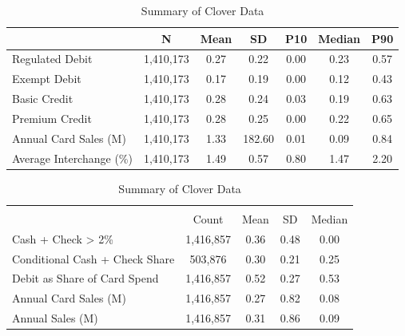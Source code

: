 \documentclass[11pt,english]{article}
\theoremstyle{remark}
\begin{document}
 
\clearpage{}


\begin{table}[H]
  \centering
  \caption{Summary of Fiserv Data}
  \label{tab:fiserv-summary}

  
    \centering
    \caption{Settlement Data Cross Section from 2022}
    \label{tab:settlement-summary}
    
    {
\def\sym#1{\ifmmode^{#1}\else\(^{#1}\)\fi}
\begin{tabular}{l*{1}{cccccc}}
\hline
                    &           N&        Mean&          SD&         P10&      Median&         P90\\
\hline
Regulated Debit     &   1,410,173&        0.27&        0.22&        0.00&        0.23&        0.57\\
Exempt Debit        &   1,410,173&        0.17&        0.19&        0.00&        0.12&        0.43\\
Basic Credit        &   1,410,173&        0.28&        0.24&        0.03&        0.19&        0.63\\
Premium Credit      &   1,410,173&        0.28&        0.25&        0.00&        0.22&        0.65\\
Annual Card Sales (M)&   1,410,173&        1.33&      182.60&        0.01&        0.09&        0.84\\
Average Interchange (\%)&   1,410,173&        1.49&        0.57&        0.80&        1.47&        2.20\\
\hline
\end{tabular}
}
   

  \vspace{0.8em}

  
    \centering
    \caption{Summary of Clover Data}
    \label{tab:clover-summary}
    
    {
\def\sym#1{\ifmmode^{#1}\else\(^{#1}\)\fi}
\begin{tabular}{l*{1}{cccc}}
\hline\hline
                    &\multicolumn{4}{c}{}                               \\
                    &       Count&        Mean&          SD&      Median\\
\hline
Cash + Check > 2\%  &   1,416,857&        0.36&        0.48&        0.00\\
Conditional Cash + Check Share&     503,876&        0.30&        0.21&        0.25\\
Debit as Share of Card Spend&   1,416,857&        0.52&        0.27&        0.53\\
Annual Card Sales (M)&   1,416,857&        0.27&        0.82&        0.08\\
Annual Sales (M)    &   1,416,857&        0.31&        0.86&        0.09\\
\hline\hline
\end{tabular}
}
   


\end{table}
\end{document}
